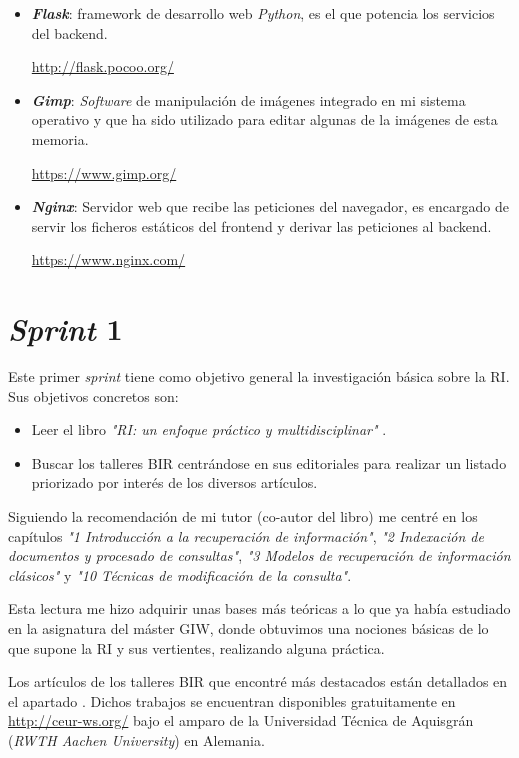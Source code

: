 \begin{itemize}
	\item \textbf{\textit{Flask}}: \Gls{framework} de desarrollo web \textit{Python}, es el que potencia los servicios del \gls{backend}.
	
	\url{http://flask.pocoo.org/}
	
	\item \textbf{\textit{Gimp}}: \textit{Software} de manipulación de imágenes integrado en mi sistema operativo y que ha sido utilizado para editar algunas de la imágenes de esta memoria.
	
	\url{https://www.gimp.org/}
	
	\item \textit{\textbf{Nginx}}: Servidor web que recibe las peticiones del navegador, es encargado de servir los ficheros estáticos del \gls{frontend} y derivar las peticiones al \gls{backend}.
	
	\url{https://www.nginx.com/}

\end{itemize}

\section{\textit{Sprint} 1}
Este primer \textit{sprint} tiene como objetivo general la investigación básica sobre la \acrshort{RI}. Sus objetivos concretos son: 

\begin{itemize}
	\item Leer el libro \textit{"\acrlong{RI}: un enfoque práctico y multidisciplinar"} \cite{RIspaBook}.
	\item Buscar los talleres \acrshort{BIR} centrándose en sus editoriales para realizar un listado priorizado por interés de los diversos artículos.
\end{itemize}

Siguiendo la recomendación de mi tutor (co-autor del libro) me centré en los capítulos \textit{"1 Introducción a la recuperación de información"}, \textit{"2 Indexación de documentos y procesado de consultas"}, \textit{"3 Modelos de recuperación de información clásicos"} y \textit{"10 Técnicas de modificación de la consulta"}. 

Esta lectura me hizo adquirir unas bases más teóricas a lo que ya había estudiado en la asignatura del máster \acrlong{GIW}, donde obtuvimos una nociones básicas de lo que supone la \acrshort{RI} y sus vertientes, realizando alguna práctica.

Los artículos de los talleres \acrlong{BIR} que encontré más destacados están detallados en el apartado . Dichos trabajos se encuentran disponibles gratuitamente en \url{http://ceur-ws.org/} bajo el amparo de la Universidad Técnica de Aquisgrán (\textit{RWTH Aachen University}) en Alemania.

